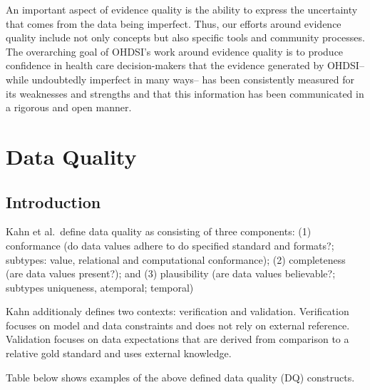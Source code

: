 \documentclass[11pt]{book}
\theoremstyle{definition}
\theoremstyle{definition}
\theoremstyle{definition}
\theoremstyle{remark}
\begin{document}
An important aspect of evidence quality is the ability to express the uncertainty that comes from the data being imperfect. Thus, our efforts around evidence quality include not only concepts but also specific tools and community processes. The overarching goal of OHDSI's work around evidence quality is to produce confidence in health care decision-makers that the evidence generated by OHDSI-- while undoubtedly imperfect in many ways-- has been consistently measured for its weaknesses and strengths and that this information has been communicated in a rigorous and open manner.

\hypertarget{DataQuality}{%
\chapter{Data Quality}\label{DataQuality}}

\hypertarget{introduction-2}{%
\section{Introduction}\label{introduction-2}}

Kahn et al.~define data quality as consisting of three components: (1) conformance (do data values adhere to do specified standard and formats?; subtypes: value, relational and computational conformance); (2) completeness (are data values present?); and (3) plausibility (are data values believable?; subtypes uniqueness, atemporal; temporal) \citep{kahn_harmonized_2016}

Kahn additionaly defines two contexts: verification and validation. Verification focuses on model and data constraints and does not rely on external reference. Validation focuses on data expectations that are derived from comparison to a relative gold standard and uses external knowledge.

Table below shows examples of the above defined data quality (DQ) constructs.
\end{document}
